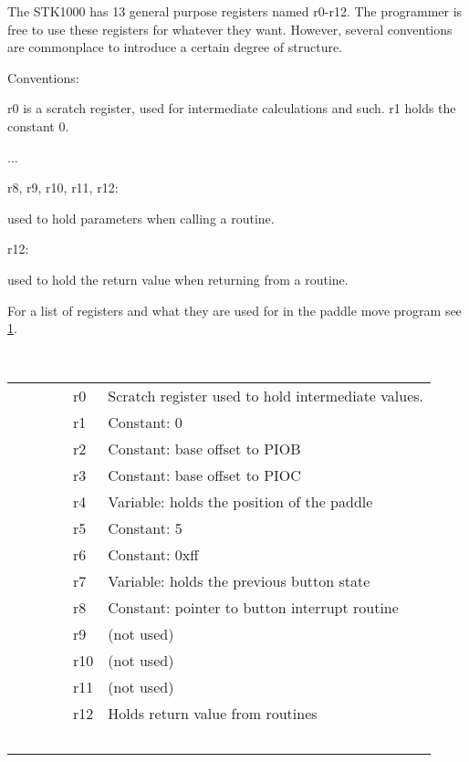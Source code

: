 The STK1000 has 13 general purpose registers named r0-r12. The programmer is free to use these registers for whatever they want.
However, several conventions are commonplace to introduce a certain degree of structure.

Conventions:

r0 is a scratch register, used for intermediate calculations and such.
r1 holds the constant 0.

...

r8, r9, r10, r11, r12:

used to hold parameters when calling a routine.

r12:

used to hold the return value when returning from a routine.


For a list of registers and what they are used for in the paddle move program see \ref{tab:regtable}.

\begin{center}
\begin{table}
    \begin{tabular}{|l|l|}
        r0  & Scratch register used to hold intermediate values. \\
        r1  & Constant: 0 \\ 
        r2  & Constant: base offset to PIOB \\ 
        r3  & Constant: base offset to PIOC \\ 
        r4  & Variable: holds the position of the paddle \\ 
        r5  & Constant: 5 \\ 
        r6  & Constant: 0xff \\ 
        r7  & Variable: holds the previous button state \\ 
        r8  & Constant: pointer to button interrupt routine \\ 
        r9  & (not used) \\ 
        r10 & (not used) \\ 
        r11 & (not used) \\ 
        r12 & Holds return value from routines \\
    \end{tabular}
\label{tab:regtable}
\end{table}
\end{center}
